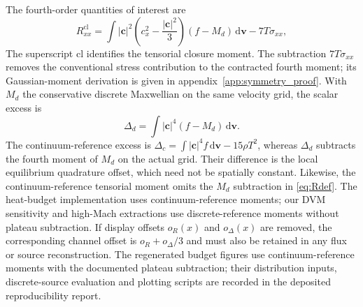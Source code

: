 \documentclass[lineno,paper]{JFM-FLM_Au}
\newenvironment{revision}{\nolinenumbers\begin{tcolorbox}[breakable,colback=revisionyellow,colframe=revisionyellow,boxrule=0pt,arc=0pt,left=5pt,right=5pt,top=5pt,bottom=5pt,before skip=6pt,after skip=6pt]\captionsetup{width=\linewidth}}{\end{tcolorbox}\linenumbers}
\newenvironment{revision}{}{}
\newcommand{\dd}{\mathrm{d}}
\newcommand{\cl}{\mathrm{cl}}
\begin{document}
\begin{revision}
The fourth-order quantities of interest are
\begin{equation}
  R^{\cl}_{xx}
  =\int |\boldsymbol c|^2\left(c_x^2-\frac{|\boldsymbol c|^2}{3}\right)(f-M_d)\,\dd\boldsymbol v
   - 7T\sigma_{xx},
  \label{eq:Rdef}
\end{equation}
The superscript $\mathrm{cl}$ identifies the tensorial closure moment. The subtraction $7T\sigma_{xx}$ removes the conventional stress contribution to the contracted fourth moment; its Gaussian-moment derivation is given in appendix~\ref{app:symmetry_proof}. With $M_d$ the conservative discrete Maxwellian on the same velocity grid, the scalar excess is
\begin{equation}
  \Delta_d=\int |\boldsymbol c|^4(f-M_d)\,\dd\boldsymbol v .
  \label{eq:Deltadef}
\end{equation}
The continuum-reference excess is $\Delta_c=\int |\boldsymbol c|^4 f\,\dd\boldsymbol v-15\rho T^2$, whereas $\Delta_d$ subtracts the fourth moment of $M_d$ on the actual grid. Their difference is the local equilibrium quadrature offset, which need not be spatially constant. Likewise, the continuum-reference tensorial moment omits the $M_d$ subtraction in \eqref{eq:Rdef}. The heat-budget implementation uses continuum-reference moments; our DVM sensitivity and high-Mach extractions use discrete-reference moments without plateau subtraction. If display offsets $o_R(x)$ and $o_\Delta(x)$ are removed, the corresponding channel offset is $o_R+o_\Delta/3$ and must also be retained in any flux or source reconstruction. The regenerated budget figures use continuum-reference moments with the documented plateau subtraction; their distribution inputs, discrete-source evaluation and plotting scripts are recorded in the deposited reproducibility report.
\end{revision}
\end{document}
